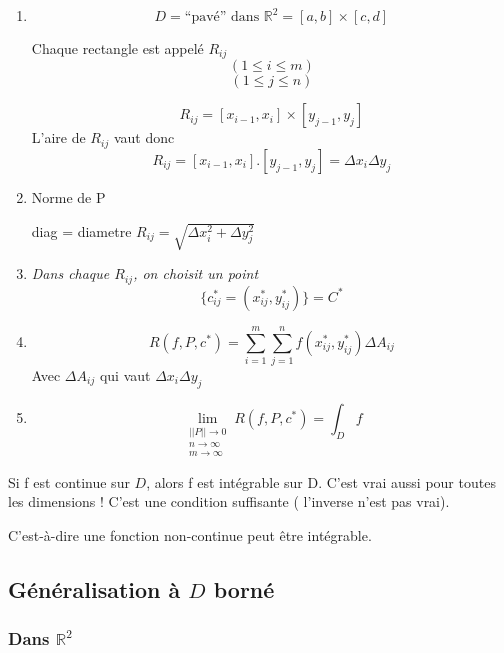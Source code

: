 \begin{enumerate}
\item

$$D= \text{``pavé'' dans }\mathbb{R}^2 = [a,b]\times[c,d]$$

Chaque rectangle est appelé $R_{ij}$
\[(1 \le i \le m)\]
\[(1 \le j \le n)\]

$$R_{ij}=[x_{i-1},x_i]\times[y_{j-1},y_j]$$
L'aire de $R_{ij}$ vaut donc
$$R_{ij}=[x_{i-1},x_i] . [y_{j-1},y_j]= \Delta x_i \Delta y_j$$

\item{Norme de P}


diag = diametre $R_{ij}= \sqrt{\Delta x_i^2+\Delta y_j^2}$


\item


\textit{Dans chaque $R_{ij}$, on choisit un point}
$$\{c_{ij}^* = (x_{ij}^*,y_{ij}^*)\} = C^*$$

\item
$$R(f, P,c^*)=\sum_{i=1}^{m} \sum_{j=1}^{n} f(x_{ij}^*,y_{ij}^*)\Delta A_{ij}$$
Avec $\Delta A_{ij}$ qui vaut $\Delta x_i \Delta y_j$


\item

$$\lim\limits_{\substack{||P|| \to 0 \\ n \to \infty\\ m \to \infty}} R(f,P,c^*)=\int_D f$$

\end{enumerate}



\begin{mytheo}

 Si f est continue sur $D$, alors f est intégrable sur D. C'est vrai aussi pour toutes les dimensions ! C'est une condition suffisante ( l'inverse n'est pas vrai).

C'est-à-dire une fonction non-continue peut être intégrable.

\end{mytheo}






\subsection{ Généralisation à $D$ borné }

\subsubsection{ Dans $ \mathbb{R}^2$ }






